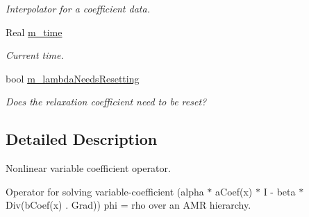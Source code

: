\begin{DoxyCompactItemize}
\begin{DoxyCompactList}\small\item\em Interpolator for a coefficient data. \end{DoxyCompactList}\item 
\hypertarget{class_a_m_r_non_linear_multi_comp_op_a70bf32d1723de157b96d70bd53d2f255}{Real \hyperlink{class_a_m_r_non_linear_multi_comp_op_a70bf32d1723de157b96d70bd53d2f255}{m\-\_\-time}}\label{class_a_m_r_non_linear_multi_comp_op_a70bf32d1723de157b96d70bd53d2f255}

\begin{DoxyCompactList}\small\item\em Current time. \end{DoxyCompactList}\item 
\hypertarget{class_a_m_r_non_linear_multi_comp_op_a799454b3424eebb1f152b131cf6ea1f4}{bool \hyperlink{class_a_m_r_non_linear_multi_comp_op_a799454b3424eebb1f152b131cf6ea1f4}{m\-\_\-lambda\-Needs\-Resetting}}\label{class_a_m_r_non_linear_multi_comp_op_a799454b3424eebb1f152b131cf6ea1f4}

\begin{DoxyCompactList}\small\item\em Does the relaxation coefficient need to be reset? \end{DoxyCompactList}\end{DoxyCompactItemize}


\subsection{Detailed Description}
Nonlinear variable coefficient operator. 

Operator for solving variable-\/coefficient (alpha $\ast$ a\-Coef(x) $\ast$ I -\/ beta $\ast$ Div(b\-Coef(x) . Grad)) phi = rho over an A\-M\-R hierarchy. 

